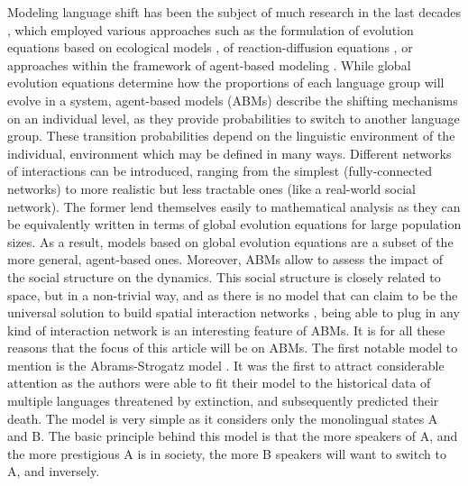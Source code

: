 \documentclass[../thesis.tex]{subfiles}
\begin{document}
Modeling language shift has been the subject of much research in the last decades
\cite{CastellanoStatisticalPhysics2009,BoissonneaultSystematicInterdisciplinary2021},
which employed various approaches such as the formulation of evolution equations based
on ecological models
\cite{MiraInterlinguisticSimilarity2005,PinascoCoexistenceLanguages2006,KandlerEcologicalModels2008,SoleDiversityCompetition2010,HeinsaluRoleBilinguals2014},
of reaction-diffusion equations
\cite{KandlerDemographyLanguage2009,PatriarcaInfluenceGeography2009,IsernLanguageExtinction2014,ProchazkaQuantifyingDriving2017},
or approaches within the framework of agent-based modeling
\cite{CastelloOrderingDynamics2006,MinettModellingEndangered2008,CaridiSchellingvoterModel2013,ProchazkaQuantifyingDriving2017}.
While global evolution equations determine how the proportions of each language group
will evolve in a system, agent-based models (ABMs) describe the shifting mechanisms on
an individual level, as they provide probabilities to switch to another language group.
These transition probabilities depend on the linguistic environment of the individual,
environment which may be defined in many ways. Different networks of interactions can be
introduced, ranging from the simplest (fully-connected networks) to more realistic but
less tractable ones (like a real-world social network). The former lend themselves
easily to mathematical analysis as they can be equivalently written in terms of global
evolution equations for large population sizes. As a result, models based on global
evolution equations are a subset of the more general, agent-based ones. Moreover, ABMs
allow to assess the impact of the social structure on the dynamics. This social
structure is closely related to space, but in a non-trivial way, and as there is no
model that can claim to be the universal solution to build spatial interaction networks
\cite{BarbosaHumanMobility2018}, being able to plug in any kind of interaction network
is an interesting feature of ABMs. It is for all these reasons that the focus of this
article will be on ABMs. The first notable model to mention is the Abrams-Strogatz model
\cite{AbramsModellingDynamics2003}. It was the first to attract considerable attention
as the authors were able to fit their model to the historical data of multiple languages
threatened by extinction, and subsequently predicted their death. The model is very
simple as it considers only the monolingual states A and B. The basic principle behind
this model is that the more speakers of A, and the more prestigious A is in society, the
more B speakers will want to switch to A, and inversely.
\end{document}

